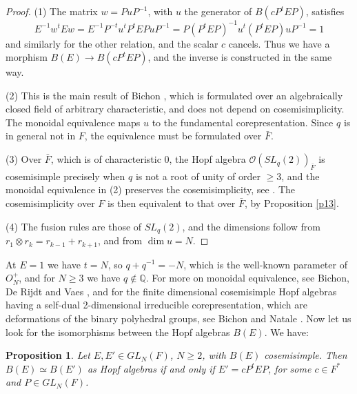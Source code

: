 \documentclass[11pt]{amsart}
\newtheorem{proposition}[theorem]{Proposition}
\theoremstyle{definition}
\begin{document}
\begin{proof}
(1) The matrix $w=PuP^{-1}$, with $u$ the generator of $B(cP^tEP)$, satisfies
$$E^{-1}w^tEw=E^{-1}P^{-t}u^tP^tEPuP^{-1}=P(P^tEP)^{-1}u^t(P^tEP)uP^{-1}=1$$
and similarly for the other relation, and the scalar $c$ cancels. Thus we have a morphism $B(E)\to B(cP^tEP)$, and the inverse is constructed in the same way.

(2) This is the main result of Bichon \cite{bic}, which is formulated over an algebraically closed field of arbitrary characteristic, and does not depend on cosemisimplicity. The monoidal equivalence maps $u$ to the fundamental corepresentation. Since $q$ is in general not in $F$, the equivalence must be formulated over $\bar F$.

(3) Over $\bar F$, which is of characteristic $0$, the Hopf algebra $\mathcal O(SL_q(2))_{\bar F}$ is cosemisimple precisely when $q$ is not a root of unity of order $\geq3$, and the monoidal equivalence in (2) preserves the cosemisimplicity, see \cite{bic}. The cosemisimplicity over $F$ is then equivalent to that over $\bar F$, by Proposition \ref{p13}.

(4) The fusion rules are those of $SL_q(2)$, and the dimensions follow from $r_1\otimes r_k=r_{k-1}+r_{k+1}$, and from $\dim u=N$.
\end{proof}

At $E=1$ we have $t=N$, so $q+q^{-1}=-N$, which is the well-known parameter of $O_N^+$, and for $N\geq3$ we have $q\notin\mathbb Q$. For more on monoidal equivalence, see Bichon, De Rijdt and Vaes \cite{bdv}, and for the finite dimensional cosemisimple Hopf algebras having a self-dual 2-dimensional irreducible corepresentation, which are deformations of the binary polyhedral groups, see Bichon and Natale \cite{bna}. Now let us look for the isomorphisms between the Hopf algebras $B(E)$. We have:

\begin{proposition}
\label{p33}
Let $E,E'\in GL_N(F)$, $N\geq2$, with $B(E)$ cosemisimple. Then $B(E)\simeq B(E')$ as Hopf algebras if and only if $E'=cP^tEP$, for some $c\in F^*$ and $P\in GL_N(F)$.
\end{proposition}
\end{document}
